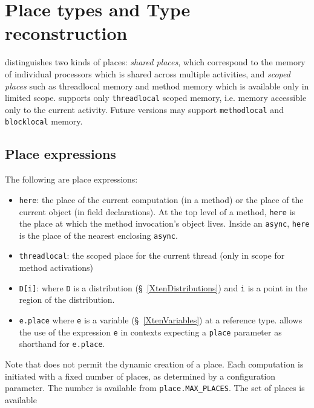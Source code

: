 \section{Place types and Type reconstruction}\label{PlaceTypes}

\Xten{} distinguishes two kinds of places: {\em shared places}\label{SharedPlaces}, 
which correspond to the memory of individual processors which is
shared across multiple activities, and {\em scoped
places}\label{ScopedPlaces} such as threadlocal
memory and method memory which is available only in limited
scope. \XtenCurrVer{} supports only {\tt threadlocal} scoped memory,
i.e.{} memory accessible only to the current activity.  Future
versions may support {\tt methodlocal} and {\tt blocklocal} memory.

\subsection{Place expressions}
The following are place expressions:
\begin{itemize}

\item {\tt here}: the place of the current computation
(in a method) or the place of the current object (in field
declarations).  At the top level of a method, {\tt here} is the place
at which the method invocation's object lives. Inside an {\tt async},
{\tt here} is the place of the nearest enclosing {\tt async}.

{}\item {\tt threadlocal}: the scoped place for the current thread
(only in scope for method activations)

{}\item {\tt D[i]}: where {\tt D} is a distribution
(\S~\ref{XtenDistributions}) and {\tt i} is a point in the region of
the distribution.

{}\item {\tt e.place} where {\tt e} is a variable
(\S~\ref{XtenVariables}) at a reference type. \Xten{} allows the use
of the expression {\tt e} in contexts expecting a {\tt place}
parameter as shorthand for {\tt e.place}.
\end{itemize}
Note that \XtenCurrVer{} does not permit the dynamic creation of a
place. Each \Xten{} computation is initiated with a fixed number of
places, as determined by a configuration parameter. The number is available
from {\tt place.MAX\_PLACES}.  The set of places is available 

